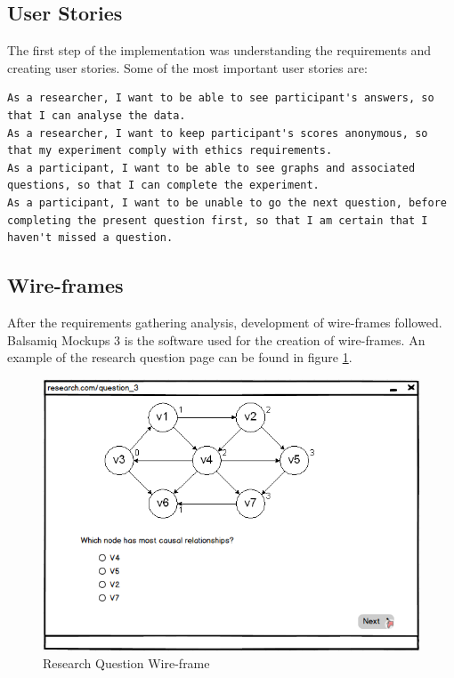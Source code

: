 \documentclass{l4proj}
\begin{document}
\subsection{User Stories}

The first step of the implementation was understanding the requirements and creating user stories. Some of the most important user stories are:

\begin{verbatim}
As a researcher, I want to be able to see participant's answers, so that I can analyse the data.
As a researcher, I want to keep participant's scores anonymous, so that my experiment comply with ethics requirements.
As a participant, I want to be able to see graphs and associated questions, so that I can complete the experiment.
As a participant, I want to be unable to go the next question, before completing the present question first, so that I am certain that I haven't missed a question.
\end{verbatim}

\subsection{Wire-frames}
After the requirements gathering analysis, development of wire-frames followed. Balsamiq Mockups 3 is the software used for the creation of wire-frames. An example of the research question page can be found in figure \ref{researchQuestion}.

\begin{figure}[H]
\centering
\includegraphics[]{researchQuestion.PNG}
\caption{Research Question Wire-frame}
\label{researchQuestion}
\end{figure}
 
\end{document}
